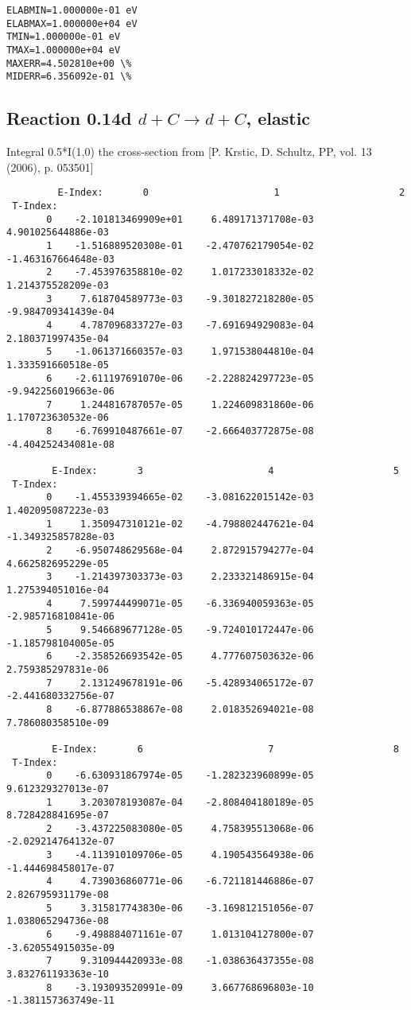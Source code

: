 \documentclass[12pt,dvipdfmx]{article}
\begin{document}
{\begin{small}
\begin{verbatim}
ELABMIN=1.000000e-01 eV
ELABMAX=1.000000e+04 eV
TMIN=1.000000e-01 eV
TMAX=1.000000e+04 eV
MAXERR=4.502810e+00 \%
MIDERR=6.356092e-01 \%
\end{verbatim}\end{small}
\newpage

\subsection{
Reaction 0.14d  $d + C \rightarrow d + C$, elastic}

Integral 0.5*I(1,0) the cross-section from [P. Krstic, D. Schultz, PP, vol. 13 (2006), p. 053501]

\begin{small}\begin{verbatim}
         E-Index:       0                      1                     2
 T-Index:
       0    -2.101813469909e+01     6.489171371708e-03     4.901025644886e-03
       1    -1.516889520308e-01    -2.470762179054e-02    -1.463167664648e-03
       2    -7.453976358810e-02     1.017233018332e-02     1.214375528209e-03
       3     7.618704589773e-03    -9.301827218280e-05    -9.984709341439e-04
       4     4.787096833727e-03    -7.691694929083e-04     2.180371997435e-04
       5    -1.061371660357e-03     1.971538044810e-04     1.333591660518e-05
       6    -2.611197691070e-06    -2.228824297723e-05    -9.942256019663e-06
       7     1.244816787057e-05     1.224609831860e-06     1.170723630532e-06
       8    -6.769910487661e-07    -2.666403772875e-08    -4.404252434081e-08

        E-Index:       3                      4                     5
 T-Index:
       0    -1.455339394665e-02    -3.081622015142e-03     1.402095087223e-03
       1     1.350947310121e-02    -4.798802447621e-04    -1.349325857828e-03
       2    -6.950748629568e-04     2.872915794277e-04     4.662582695229e-05
       3    -1.214397303373e-03     2.233321486915e-04     1.275394051016e-04
       4     7.599744499071e-05    -6.336940059363e-05    -2.985716810841e-06
       5     9.546689677128e-05    -9.724010172447e-06    -1.185798104005e-05
       6    -2.358526693542e-05     4.777607503632e-06     2.759385297831e-06
       7     2.131249678191e-06    -5.428934065172e-07    -2.441680332756e-07
       8    -6.877886538867e-08     2.018352694021e-08     7.786080358510e-09

        E-Index:       6                      7                     8
 T-Index:
       0    -6.630931867974e-05    -1.282323960899e-05     9.612329327013e-07
       1     3.203078193087e-04    -2.808404180189e-05     8.728428841695e-07
       2    -3.437225083080e-05     4.758395513068e-06    -2.029214764132e-07
       3    -4.113910109706e-05     4.190543564938e-06    -1.444698458017e-07
       4     4.739036860771e-06    -6.721181446886e-07     2.826795931179e-08
       5     3.315817743830e-06    -3.169812151056e-07     1.038065294736e-08
       6    -9.498884071161e-07     1.013104127800e-07    -3.620554915035e-09
       7     9.310944420933e-08    -1.038636437355e-08     3.832761193363e-10
       8    -3.193093520991e-09     3.667768696803e-10    -1.381157363749e-11


\end{verbatim}
\end{small}}
\end{document}
